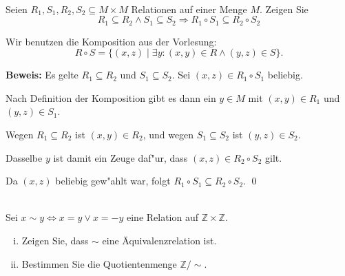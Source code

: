 \\
Seien $R_1,S_1,R_2,S_2\subseteq M\times M$ Relationen auf einer Menge $M$. Zeigen Sie \[R_1\subseteq R_2\wedge S_1\subseteq S_2\Rightarrow R_1\circ S_1\subseteq R_2\circ S_2\]

\begin{loesung}
Wir benutzen die Komposition aus der Vorlesung:
\[R\circ S=\{(x,z)\mid\exists y:(x,y)\in R\wedge (y,z)\in S\}.\]

\textbf{Beweis:} Es gelte $R_1\subseteq R_2$ und $S_1\subseteq S_2$. Sei $(x,z)\in R_1\circ S_1$ beliebig.

Nach Definition der Komposition gibt es dann ein $y\in M$ mit $(x,y)\in R_1$ und $(y,z)\in S_1$.

Wegen $R_1\subseteq R_2$ ist $(x,y)\in R_2$, und wegen $S_1\subseteq S_2$ ist $(y,z)\in S_2$.

Dasselbe $y$ ist damit ein Zeuge daf"ur, dass $(x,z)\in R_2\circ S_2$ gilt.

Da $(x,z)$ beliebig gew"ahlt war, folgt $R_1\circ S_1\subseteq R_2\circ S_2$. \qed
\end{loesung}

\\
Sei $x\sim y\Leftrightarrow x=y \vee x=-y$ eine Relation auf $\mathbb{Z}\times\mathbb{Z}$. 
\begin{enumerate}[(i)]
    \item Zeigen Sie, dass $\sim$ eine Äquivalenzrelation ist.
    \item Bestimmen Sie die Quotientenmenge $\mathbb{Z}/\sim$.
\end{enumerate}

